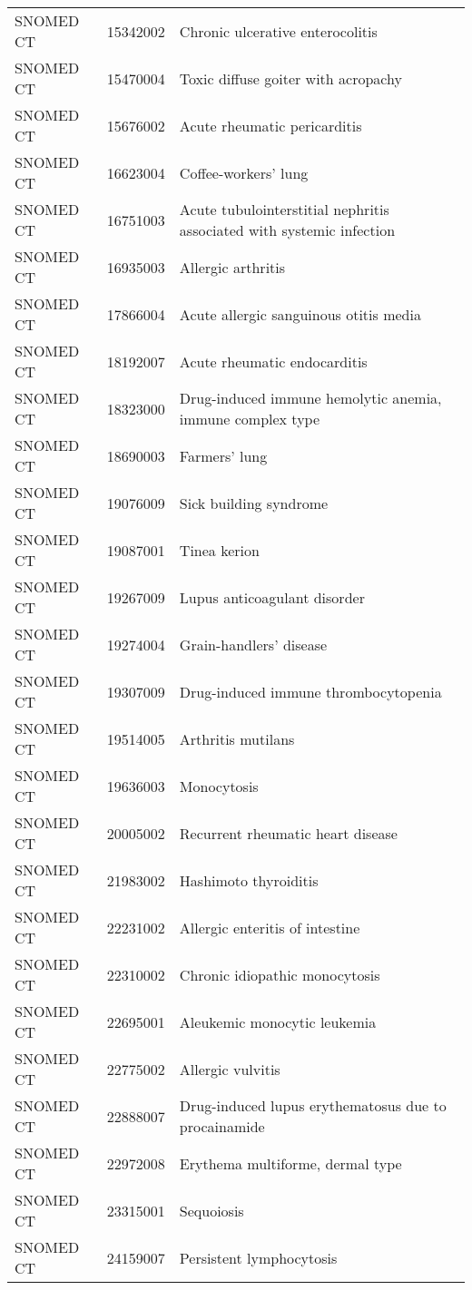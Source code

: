 \begin{longtable}{p{}p{}p{}}
  SNOMED CT & 15342002 & Chronic ulcerative enterocolitis \\ 
  SNOMED CT & 15470004 & Toxic diffuse goiter with acropachy \\ 
  SNOMED CT & 15676002 & Acute rheumatic pericarditis \\ 
  SNOMED CT & 16623004 & Coffee-workers' lung \\ 
  SNOMED CT & 16751003 & Acute tubulointerstitial nephritis associated with systemic infection \\ 
  SNOMED CT & 16935003 & Allergic arthritis \\ 
  SNOMED CT & 17866004 & Acute allergic sanguinous otitis media \\ 
  SNOMED CT & 18192007 & Acute rheumatic endocarditis \\ 
  SNOMED CT & 18323000 & Drug-induced immune hemolytic anemia, immune complex type \\ 
  SNOMED CT & 18690003 & Farmers' lung \\ 
  SNOMED CT & 19076009 & Sick building syndrome \\ 
  SNOMED CT & 19087001 & Tinea kerion \\ 
  SNOMED CT & 19267009 & Lupus anticoagulant disorder \\ 
  SNOMED CT & 19274004 & Grain-handlers' disease \\ 
  SNOMED CT & 19307009 & Drug-induced immune thrombocytopenia \\ 
  SNOMED CT & 19514005 & Arthritis mutilans \\ 
  SNOMED CT & 19636003 & Monocytosis \\ 
  SNOMED CT & 20005002 & Recurrent rheumatic heart disease \\ 
  SNOMED CT & 21983002 & Hashimoto thyroiditis \\ 
  SNOMED CT & 22231002 & Allergic enteritis of intestine \\ 
  SNOMED CT & 22310002 & Chronic idiopathic monocytosis \\ 
  SNOMED CT & 22695001 & Aleukemic monocytic leukemia \\ 
  SNOMED CT & 22775002 & Allergic vulvitis \\ 
  SNOMED CT & 22888007 & Drug-induced lupus erythematosus due to procainamide \\ 
  SNOMED CT & 22972008 & Erythema multiforme, dermal type \\ 
  SNOMED CT & 23315001 & Sequoiosis \\ 
  SNOMED CT & 24159007 & Persistent lymphocytosis \\ 

\end{longtable}
